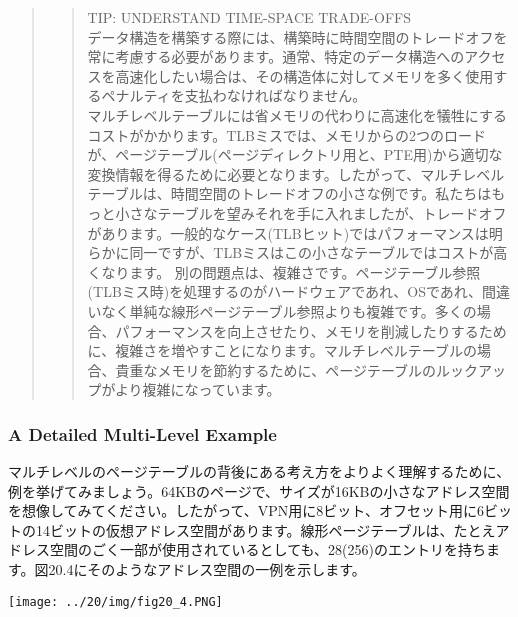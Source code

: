 \begin{quote}
\begin{quote}
TIP: UNDERSTAND TIME-SPACE TRADE-OFFS\\
データ構造を構築する際には、構築時に時間空間のトレードオフを常に考慮する必要があります。通常、特定のデータ構造へのアクセスを高速化したい場合は、その構造体に対してメモリを多く使用するペナルティを支払わなければなりません。\\
マルチレベルテーブルには省メモリの代わりに高速化を犠牲にするコストがかかります。TLBミスでは、メモリからの2つのロードが、ページテーブル(ページディレクトリ用と、PTE用)から適切な変換情報を得るために必要となります。したがって、マルチレベルテーブルは、時間空間のトレードオフの小さな例です。私たちはもっと小さなテーブルを望みそれを手に入れましたが、トレードオフがあります。一般的なケース(TLBヒット)ではパフォーマンスは明らかに同一ですが、TLBミスはこの小さなテーブルではコストが高くなります。
別の問題点は、複雑さです。ページテーブル参照(TLBミス時)を処理するのがハードウェアであれ、OSであれ、間違いなく単純な線形ページテーブル参照よりも複雑です。多くの場合、パフォーマンスを向上させたり、メモリを削減したりするために、複雑さを増やすことになります。マルチレベルテーブルの場合、貴重なメモリを節約するために、ページテーブルのルックアップがより複雑になっています。
\end{quote}
\end{quote}

\hypertarget{a-detailed-multi-level-example}{%
\subsubsection*{A Detailed Multi-Level
Example}\label{a-detailed-multi-level-example}}

マルチレベルのページテーブルの背後にある考え方をよりよく理解するために、例を挙げてみましょう。64KBのページで、サイズが16KBの小さなアドレス空間を想像してみてください。したがって、VPN用に8ビット、オフセット用に6ビットの14ビットの仮想アドレス空間があります。線形ページテーブルは、たとえアドレス空間のごく一部が使用されているとしても、28(256)のエントリを持ちます。図20.4にそのようなアドレス空間の一例を示します。

\texttt{[image: ../20/img/fig20\_4.PNG]}

